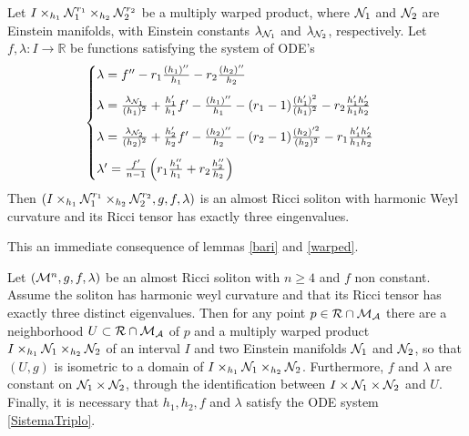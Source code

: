    \begin{teorema}\label{localstrucDuploEnuncValter}
	Let $I \times_{h_1} \mathcal{N}_1^{r_{1}} \times_{h_2} \mathcal{N}_2^{r_{2}}$ be a multiply warped product, where $\mathcal{N}_1$ and $\mathcal{N}_2$ are Einstein manifolds, with Einstein constants $\lambda_{\mathcal{N}_1}$ and $\lambda_{\mathcal{N}_2}$, respectively.  Let $f,\lambda:I\rightarrow\mathbb{R}$ be functions satisfying the system of ODE's
	\begin{equation}\label{SistemaTriplo}
		\begin{cases}
			\lambda = f'' - r_1 \frac{(h_1)''}{h_1} - r_2 \frac{(h_2)''}{h_2} \vspace{0.3cm} \\
		\lambda = \frac{\lambda_{\nn_1}}{(h_1)^2} + \frac{h_1'}{h_1} f' - \frac{(h_1)''}{h_1} - (r_1 - 1) \frac{(h_1')^2}{(h_1)^2} - r_2 \frac{h_1 ' h_2' }{h_1 h_2} \vspace{0.3cm}\\ 
		\lambda = \frac{\lambda_{\nn_2}}{(h_2)^2} + \frac{h_2'}{h_2} f' - \frac{(h_2)''}{h_2} - (r_2 - 1) \frac{(h_2)'^2}{(h_2)^2} - r_1 \frac{h_1 ' h_2' }{h_1 h_2} \vspace{0.3cm} \\
		\lambda' = \frac{f'}{n-1}\pa{r_1 \frac{h_1''}{h_1} + r_2 \frac{h_2''}{h_2}}
		\end{cases}
		\end{equation}
  Then $\left(I \times_{h_1} \mathcal{N}_1^{r_{1}} \times_{h_2} \mathcal{N}_2^{r_{2}}, g, f,\lambda\right)$ is an almost Ricci soliton with harmonic Weyl curvature and its Ricci tensor has exactly three eingenvalues.
\end{teorema}

\begin{demm}
	This an immediate consequence of lemmas \cref{bari} and \cref{warped}.
\end{demm}

\begin{teorema}\label{localstrucDuploEnuncValter-REC}
Let $\left(\mathcal{M}^n, g, f, \lambda\right)$ be an almost Ricci soliton with $n \geq 4$ and $f$ non constant. Assume the soliton has harmonic weyl curvature and that its Ricci tensor has exactly three distinct eigenvalues. Then for any point $p\in\mathcal{R}\cap \mathcal{M}_{\mathcal{A}}$ there are a neighborhood $U\subset\mathcal{R}\cap \mathcal{M}_{\mathcal{A}}$ of $p$ and a multiply warped product $I \times_{h_1} \mathcal{N}_1 \times_{h_2} \mathcal{N}_2$ of an interval $I$ and two Einstein manifolds $\mathcal{N}_1$ and $\mathcal{N}_2$, so that $(U,g)$ is isometric to a domain of $I \times_{h_1} \mathcal{N}_1 \times_{h_2} \mathcal{N}_2$. Furthermore, $f$ and $\lambda$ are constant on $\mathcal{N}_{1}\times\mathcal{N}_{2}$, through the identification between $I\times\mathcal{N}_{1}\times\mathcal{N}_{2}$ and $U$. Finally, it is necessary that $h_1, h_2, f$ and $\lambda$ satisfy the ODE system \cref{SistemaTriplo}.

\end{teorema}


